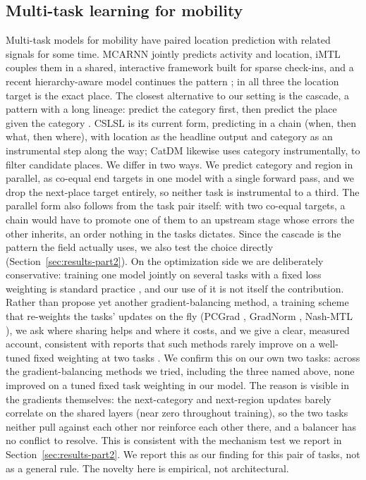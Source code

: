 \subsection{Multi-task learning for mobility}
\label{sec:related-mtl}
Multi-task models for mobility have paired location prediction with related
signals for some time. MCARNN \cite{Liao2018} jointly predicts activity and
location, iMTL \cite{Zhang2020} couples them in a shared, interactive
framework built for sparse check-ins, and a recent hierarchy-aware model
continues the pattern \cite{wang2025hamtl}; in all three the location target is
the exact place. The closest alternative to our setting is
the cascade, a pattern with a long lineage: predict the category first, then
predict the place given the category \cite{ye2013nextmove, he2017lbpr}. CSLSL
\cite{huang2024cslsl} is its current form, predicting in a chain (when, then what,
then where), with location as the headline output and category as an
instrumental step along the way; CatDM \cite{yu2020catdm} likewise uses category
instrumentally, to filter candidate places. We differ in two ways. We predict
category and region in parallel, as co-equal end targets in one model with a
single forward pass, and we drop the next-place target entirely, so neither task
is instrumental to a third. The parallel form also follows from the task pair
itself: with two co-equal targets, a chain would have to promote one of them to
an upstream stage whose errors the other inherits, an order nothing in the tasks
dictates. Since the cascade is the pattern the field actually uses, we also test
the choice directly (Section~\ref{sec:results-part2}). On the optimization side we are deliberately
conservative: training one model jointly on several tasks with a fixed loss weighting is standard practice
\cite{caruana1997multitask}, and our use of it is not itself the contribution.
Rather than propose yet another gradient-balancing method, a training scheme
that re-weights the tasks' updates on the fly (PCGrad \cite{yu2020pcgrad},
GradNorm \cite{chen2018gradnorm}, Nash-MTL \cite{navon2022nashmtl}), we ask
where sharing helps and where it costs, and we give a clear, measured account,
consistent with reports that such methods rarely improve on a well-tuned fixed
weighting at two tasks \cite{xin2022domtl, kurin2022defense}. We confirm this on
our own two tasks: across the gradient-balancing methods we tried, including the
three named above, none improved on a tuned fixed task weighting in our model.
The reason is visible in the gradients themselves: the next-category and
next-region updates barely correlate on the shared layers (near zero throughout training), so the two tasks neither pull
against each other nor reinforce each other there, and a balancer has no conflict
to resolve. This is consistent with the mechanism test we report in
Section~\ref{sec:results-part2}. We report this as our finding for this
pair of tasks, not as a general rule. The novelty here is empirical, not
architectural.

